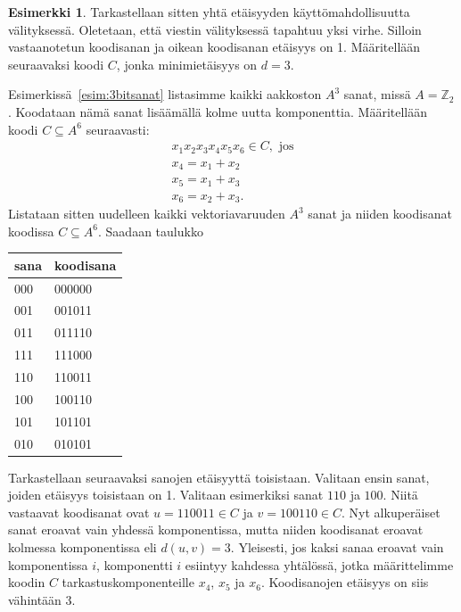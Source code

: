 \documentclass[a4paper,12pt,leqno,oneside]{report} %
\theoremstyle{plain}
\theoremstyle{plain}
\theoremstyle{definition}
\newtheorem{esimerkki}{Esimerkki}[chapter]
\theoremstyle{remark}
\numberwithin{equation}{chapter}
\newcommand*{\Zset}{\mathbb{Z}}  %
\begin{document}
    \begin{esimerkki}\label{esim:minetaisyys}
        Tarkastellaan sitten yhtä etäisyyden käyttömahdollisuutta välityksessä. Oletetaan, että viestin välityksessä tapahtuu yksi virhe. Silloin vastaanotetun koodisanan ja oikean koodisanan etäisyys on 1. Määritellään seuraavaksi koodi $C$, jonka minimietäisyys on $d = 3$.

        Esimerkissä~\ref{esim:3bitsanat} listasimme kaikki aakkoston $A^3$ sanat, missä $A = \Zset_2$. Koodataan nämä sanat lisäämällä kolme uutta komponenttia. Määritellään koodi $C \subseteq A^6$ seuraavasti:
        \begin{gather*}
            x_1x_2x_3x_4x_5x_6 \in C, \text{ jos} \\
            x_4 = x_1 + x_2 \\
            x_5 = x_1 + x_3 \\
            x_6 = x_2 + x_3.
        \end{gather*}
        Listataan sitten uudelleen kaikki vektoriavaruuden $A^3$ sanat ja niiden koodisanat koodissa $C \subseteq A^6$. Saadaan taulukko
        \begin{center}
            \begin{tabular}[htb]{ll}
                sana & koodisana \\ \midrule
                000 & 000000\\
                001 & 001011\\
                011 & 011110\\
                111 & 111000\\
                110 & 110011\\
                100 & 100110\\
                101 & 101101\\
                010 & 010101\\
            \end{tabular}
        \end{center}
        
        Tarkastellaan seuraavaksi sanojen etäisyyttä toisistaan. Valitaan ensin sanat, joiden etäisyys toisistaan on 1. Valitaan esimerkiksi sanat $110$ ja $100$. Niitä vastaavat koodisanat ovat $u = 110011 \in C$ ja $v = 100110 \in C$. Nyt alkuperäiset sanat eroavat vain yhdessä komponentissa, mutta niiden koodisanat eroavat kolmessa komponentissa eli $d(u,v) = 3$. Yleisesti, jos kaksi sanaa eroavat vain komponentissa $i$, komponentti $i$ esiintyy kahdessa yhtälössä, jotka määrittelimme koodin $C$ tarkastuskomponenteille
        $x_4$, $x_5$ ja $x_6$. Koodisanojen etäisyys on siis vähintään 3.


\end{esimerkki}
\end{document}
